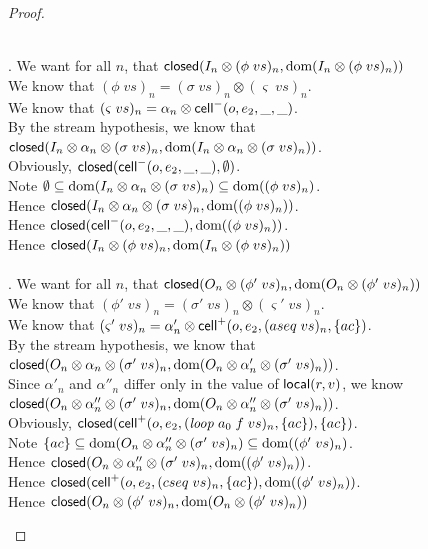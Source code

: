 \begin{proof}
\begin{enumerate}
\begin{tabbedproof}
  \\ . We want for all $n$, that $\mathsf{closed}({I_n \otimes (\phi\;vs)_n}, {\mbox{dom}({I_n \otimes (\phi\;vs)_n})})$\\
  \ooo We know that $(\phi\;vs)_n = (\sigma\;vs)_n \otimes (\varsigma\;vs)_n$. \\
  \ooo We know that $(\varsigma\;vs)_n = \alpha_n \otimes \mathsf{cell}^{-}({o}, {e_2}, {\_}, {\_})$. \\
  \ooo By the stream hypothesis, we know that \\
  \oooo $\mathsf{closed}({I_n \otimes \alpha_n \otimes (\sigma\;vs)_n}, {\mbox{dom}({I_n \otimes \alpha_n \otimes (\sigma\;vs)_n})})$. \\
  \ooo Obviously, $\mathsf{closed}({\mathsf{cell}^{-}({o}, {e_2}, {\_}, {\_})}, {\emptyset})$. \\
  \ooo Note $\emptyset \subseteq \mbox{dom}({I_n \otimes \alpha_n \otimes (\sigma\;vs)_n}) \subseteq \mbox{dom}({(\phi\;vs)_n})$. \\
  \ooo Hence $\mathsf{closed}({I_n \otimes \alpha_n \otimes (\sigma\;vs)_n}, {\mbox{dom}({(\phi\;vs)_n})})$. \\ 
  \ooo Hence $\mathsf{closed}({\mathsf{cell}^{-}({o}, {e_2}, {\_}, {\_})}, {\mbox{dom}({(\phi\;vs)_n})})$. \\
  \ooo Hence $\mathsf{closed}({I_n \otimes (\phi\;vs)_n}, {\mbox{dom}({I_n \otimes (\phi\;vs)_n})})$\\

  \\ . We want for all $n$, that $\mathsf{closed}({O_n \otimes (\phi'\;vs)_n}, {\mbox{dom}({O_n \otimes (\phi'\;vs)_n})})$\\
  \ooo We know that $(\phi'\;vs)_n = (\sigma'\;vs)_n \otimes (\varsigma'\;vs)_n$. \\
  \ooo We know that $(\varsigma'\;vs)_n = \alpha'_n \otimes \mathsf{cell}^{+}({o}, {e_2}, {(aseq\;vs)_n}, {\{{ac}\}})$. \\
  \ooo By the stream hypothesis, we know that \\
  \oooo $\mathsf{closed}({O_n \otimes \alpha_n \otimes (\sigma'\;vs)_n}, {\mbox{dom}({O_n \otimes \alpha'_n \otimes (\sigma'\;vs)_n})})$. \\
  \ooo Since $\alpha'_n$ and $\alpha''_n$ differ only in the value of $\mathsf{local}({r}, {v})$, we know \\ 
  \oooo $\mathsf{closed}({O_n \otimes \alpha''_n \otimes (\sigma'\;vs)_n}, {\mbox{dom}({O_n \otimes \alpha''_n \otimes (\sigma'\;vs)_n})})$. \\
  \ooo Obviously, $\mathsf{closed}({\mathsf{cell}^{+}({o}, {e_2}, {(\mathit{loop}\;a_0\;f\;vs)_n}, {\{{ac}\}})}, {\{{ac}\}})$. \\
  \ooo Note $\{{ac}\} \subseteq \mbox{dom}({O_n \otimes \alpha''_n \otimes (\sigma'\;vs)_n}) \subseteq \mbox{dom}({(\phi'\;vs)_n})$. \\
  \ooo Hence $\mathsf{closed}({O_n \otimes \alpha''_n \otimes (\sigma'\;vs)_n}, {\mbox{dom}({(\phi'\;vs)_n})})$. \\ 
  \ooo Hence $\mathsf{closed}({\mathsf{cell}^{+}({o}, {e_2}, {(cseq\;vs)_n}, {\{{ac}\}})}, {\mbox{dom}({(\phi'\;vs)_n})})$. \\
  \ooo Hence $\mathsf{closed}({O_n \otimes (\phi'\;vs)_n}, {\mbox{dom}({O_n \otimes (\phi'\;vs)_n})})$\\


\end{tabbedproof}
\end{enumerate}
\end{proof}
